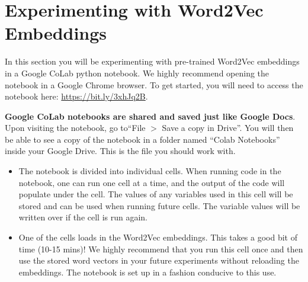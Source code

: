 \section{Experimenting with Word2Vec Embeddings}

In this section you will be experimenting with pre-trained Word2Vec embeddings in a Google CoLab python notebook. We highly recommend opening the notebook in a Google Chrome browser. To get started, you will need to access the notebook here: \url{https://bit.ly/3xhJq2B}.

\textbf{Google CoLab notebooks are shared and saved just like Google Docs}. Upon visiting the notebook, go to``File $>$ Save a copy in Drive''. You will then be able to see a copy of the notebook in a folder named “Colab Notebooks” inside your Google Drive. This is the file you should work with.

\begin{itemize}
    \item The notebook is divided into individual cells. When running code in the notebook, one can run one cell at a time, and the output of the code will populate under the cell. The values of any variables used in this cell will be stored and can be used when running future cells. The variable values will be written over if the cell is run again.  
    
    \item One of the cells loads in the Word2Vec embeddings. This takes a good bit of time (10-15 mins)! We highly recommend that you run this cell once and then use the stored word vectors in your future experiments without reloading the embeddings. The notebook is set up in a fashion conducive to this use.
\end{itemize}
\clearpage





